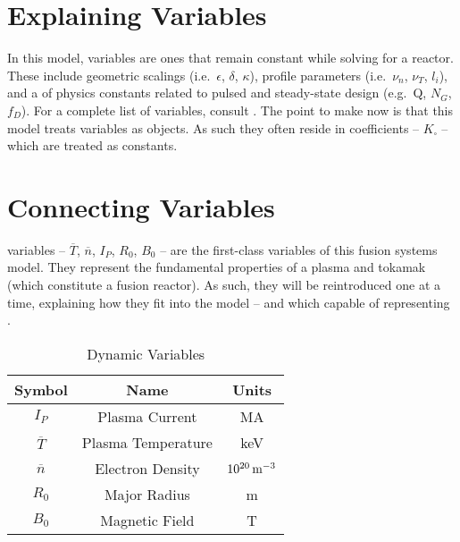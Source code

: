 \section{Explaining  Variables}

In this model,  variables are ones that remain constant while solving for a reactor. These include geometric scalings (i.e.\ $\epsilon$, $\delta$, $\kappa$), profile parameters (i.e.\ $\nu_n$, $\nu_T$, $l_i$), and a  of physics constants related to pulsed and steady-state design (e.g.\ Q, $N_G$, $f_D$). For a complete list of  variables, consult . The point to make now is that this model treats  variables as  objects. As such they often reside in  coefficients -- $K_\square$ -- which are treated as constants.

\section{Connecting  Variables}

 variables -- $\overline T$, $\overline n$, $I_P$, $R_0$, $B_0$ -- are the first-class variables of this fusion systems model. They represent the fundamental properties of a plasma and tokamak (which constitute a fusion reactor). As such, they will be reintroduced one at a time, explaining how they fit into the model -- and which  capable of representing .

\begin{table}[h!]
\centering
\caption{Dynamic Variables}
\begin{tabular}{ c|c|c }

\textbf{Symbol} & \textbf{Name} & \textbf{Units} \\
\hline
$I_P$ & Plasma Current & MA \\
$\overline{T}$ & Plasma Temperature & keV \\
$\overline{n}$ & Electron Density & $10^{20} \, \textnormal{m}^{-3}$ \\
$R_0$ &  Major Radius & m \\
$B_0$ &  Magnetic Field & T
\end{tabular}
\label{table:dynamic}
\end{table}

